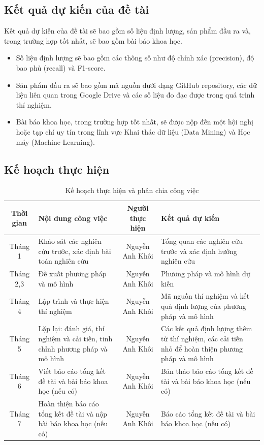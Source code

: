 {\subsection{Kết quả dự kiến của đề tài}
Kết quả dự kiến của đề tài sẽ bao gồm số liệu định lượng, sản phẩm đầu ra và, trong trường hợp tốt nhất, sẽ bao gồm bài báo khoa học.

\begin{itemize}
    \item Số liệu định lượng sẽ bao gồm các thông số như độ chính xác (precision), độ bao phủ (recall) và F1-score.
    \item Sản phẩm đầu ra sẽ bao gồm mã nguồn dưới dạng GitHub repository, các dữ liệu liên quan trong Google Drive và các số liệu đo đạc được trong quá trình thí nghiệm.
    \item Bài báo khoa học, trong trường hợp tốt nhất, sẽ được nộp đến một hội nghị hoặc tạp chí uy tín trong lĩnh vực Khai thác dữ liệu (Data Mining) và Học máy (Machine Learning).
\end{itemize}

\subsection{Kế hoạch thực hiện}
\begin{table}[H]
{\normalsize
\centering
\caption{Kế hoạch thực hiện và phân chia công việc}
\label{tab:plan}
\renewcommand{\arraystretch}{1.3}

\begin{tabularx}{\textwidth}{|c|X|c|X|}
\hline
\textbf{Thời gian} & \textbf{Nội dung công việc} & \textbf{Người thực hiện} & \textbf{Kết quả dự kiến} \\
\hline
Tháng 1 & Khảo sát các nghiên cứu trước, xác định bài toán nghiên cứu & Nguyễn Anh Khôi & Tổng quan các nghiên cứu trước và xác định hướng nghiên cứu \\
\hline
Tháng 2,3 & Đề xuất phương pháp và mô hình & Nguyễn Anh Khôi & Phương pháp và mô hình dự kiến \\
\hline
Tháng 4 & Lập trình và thực hiện thí nghiệm & Nguyễn Anh Khôi & Mã nguồn thí nghiệm và kết quả định lượng của phương pháp và mô hình \\
\hline
Tháng 5 & Lặp lại: đánh giá, thí nghiệm và cải tiến, tinh chỉnh phương pháp và mô hình  & Nguyễn Anh Khôi & Các kết quả định lượng thêm từ thí nghiệm, các cải tiến nhỏ để hoàn thiện phương pháp và mô hình \\
\hline
Tháng 6 & Viết báo cáo tổng kết đề tài và bài báo khoa học (nếu có) & Nguyễn Anh Khôi & Bản thảo báo cáo tổng kết đề tài và bài báo khoa học (nếu có) \\
\hline
Tháng 7 & Hoàn thiện báo cáo tổng kết đề tài và nộp bài báo khoa học (nếu có) & Nguyễn Anh Khôi & Báo cáo tổng kết đề tài và bài báo khoa học (nếu có) \\
\hline
\end{tabularx}
}
\end{table}

}

